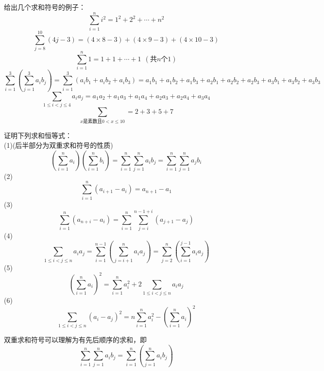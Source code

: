 \documentclass[lang=cn, zihao=5]{elegantbook}
\newcommand{\ssb}[1]{\left( #1 \right)}
\begin{document}
给出几个求和符号的例子：
$$\sum_{i=1}^{n} i^2 = 1^2 + 2^2 + \cdots + n^2$$
$$\sum_{j=8}^{10} (4j-3) = (4 \times 8-3) + (4 \times 9 - 3) + (4 \times 10 -3)$$
$$\sum_{i=1}^{n} 1 = 1 + 1 + \cdots + 1~~(\textit{共$n$个$1$})$$
$$\sum_{i=1}^{3} \ssb{\sum_{j=1}^{3} a_ib_j} = \sum_{i=1}^{3} \ssb{a_ib_1+a_ib_2+a_ib_3} = a_1b_1+a_1b_2+a_1b_3+a_2b_1+a_2b_2+a_2b_3+a_3b_1+a_3b_2+a_3b_3$$
$$\sum_{1 \leq i < j \leq 4} a_ia_j = a_1a_2 + a_1a_3 + a_1a_4 + a_2a_3 + a_2a_4 + a_3a_4$$
$$\sum_{\textit{$x$是素数且$0< x \leq 10$}} = 2+3+5+7$$

\begin{example}
	证明下列求和恒等式：\\
	(1)(后半部分为双重求和符号的性质)$$\ssb{\sum_{i=1}^{n}a_i} \ssb{\sum_{i=1}^{n}b_i} = \sum_{i=1}^{n}\sum_{j=1}^{n} a_ib_j = \sum_{i=1}^{n}\sum_{j=1}^{n} a_jb_i$$
	(2)$$\sum_{i=1}^{n}(a_{i+1}-a_i)=a_{n+1}-a_1$$
	(3)$$\sum_{i=1}^{n} (a_{n+i}-a_i) = \sum_{i=1}^n \sum_{j=i}^{n-1+i}(a_{j+1}-a_j)$$
	(4)$$\sum_{1 \leq i < j \leq n}a_ia_j = \sum_{i=1}^{n-1} \ssb{\sum_{j=i+1}^{n} a_ia_j} = \sum_{j=2}^{n} \ssb{\sum_{i=1}^{j-1} a_ia_j}$$
	(5)$$\ssb{\sum_{i=1}^n a_i}^2 = \sum_{i=1}^{n} a_i^2 + 2\sum_{1 \leq i < j \leq n}a_ia_j$$
	(6)$$\sum_{1 \leq i < j \leq n}(a_i-a_j)^2 = n\sum_{i=1}^{n} a_i^2 - \ssb{\sum_{i=1}^{n} a_i}^2$$
\end{example}
\begin{remark}
	双重求和符号可以理解为有先后顺序的求和，即$$\sum_{i=1}^{n}\sum_{j=1}^{n} a_ib_j = \sum_{i=1}^{n} \ssb{\sum_{j=1}^{n} a_ib_j}$$
\end{remark}
\end{document}
